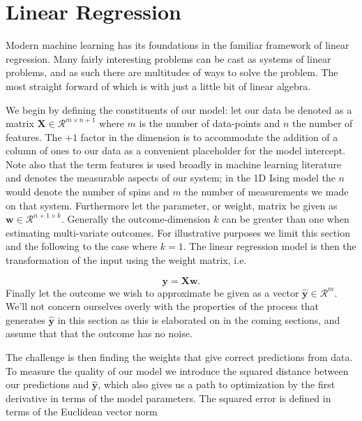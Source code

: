 
\section{Linear Regression}\label{sec:LinReg}

Modern machine learning has its foundations in the familiar framework of linear regression. Many fairly interesting problems can be cast as systems of linear problems, and as such there are multitudes of ways to solve the problem. The most straight forward of which is with just a little bit of linear algebra.

We begin by defining the constituents of our model: let our data be denoted as a matrix $\mathbf{X} \in \mathcal{R}^{m\times n+1}$ where $m$ is the number of data-points and $n$ the number of features. The $+1$ factor in the dimension is to accommodate the addition of a column of ones to our data as a convenient placeholder for the model intercept. Note also that the term features is used broadly in machine learning literature and denotes the measurable aspects of our system; in the 1D Ising model the $n$ would denote the number of spins and $m$ the number of measurements we made on that system. Furthermore let the parameter, or weight, matrix be given as $\mathbf{w} \in \mathcal{R}^{n + 1\times k}$. Generally the outcome-dimension $k$ can be greater than one when estimating multi-variate outcomes. For illustrative purposes we limit this section and the following to the case where $k=1$. The linear regression model is then the transformation of the input using the weight matrix, i.e. 

\begin{equation}\label{eq:og_linreg}
\mathbf{y} = \mathbf{X}\mathbf{w}.
\end{equation}
\noindent Finally let the outcome we wish to approximate be given as a vector $\mathbf{\hat{y}} \in \mathcal{R}^m$. We'll not concern ourselves overly with the properties of the process that generates $\mathbf{\hat{y}}$ in this section as this is elaborated on in the coming sections, and assume that that the outcome has no noise.

The challenge is then finding the weights that give correct predictions from data. To measure the quality of our model we introduce the squared distance between our predictions and $\mathbf{\hat{y}}$, which also gives us a path to optimization by the first derivative in terms of the model parameters. The squared error is defined in terms of the Euclidean vector norm  

